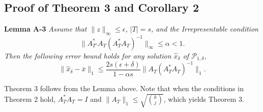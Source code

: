 \documentclass{article}
\begin{document}


%

%

\subsection{Proof of Theorem 3 and Corollary 2}

\textbf{Lemma A-3} {\it Assume that $\|z\|_\infty \leq \epsilon$, $|T|= s$, and the Irrepresentable condition 
\[ \|A^*_{T^c} A_T (A^*_T A_T)^{-1} \|_\infty \leq \alpha<1. \]
Then the following error bound holds for any solution $\hat{x}_\delta$ of $\mathcal{P}_{1,\delta}$,
\[ \|\hat{x}_\delta - \bar{x} \|_1 \leq  \frac{2s (\epsilon + \delta)} {1 - \alpha s} \|A_T(A^*_T A_T)^{-1} \|_1. \] }

Theorem 3 follows from the Lemma above. Note that when the conditions in Theorem 2 hold, $A^*_T A_T = I$ and $\|A_T\|_1 \leq \sqrt{{k \choose j}}$, which yields Theorem 3. 
\end{document}

